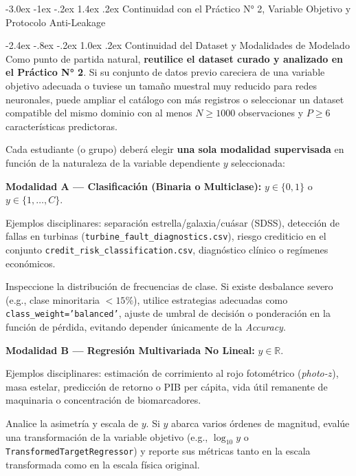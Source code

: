 \documentclass[11pt,a4paper]{article}
\makeatletter
\renewcommand\section{\@startsection{section}{1}{\z@}%
  {-3.0ex \@plus -1ex \@minus -.2ex}%
  {1.4ex \@plus .2ex}%
  {\color{NavyMain}\normalfont\Large\bfseries}}
\renewcommand\subsection{\@startsection{subsection}{2}{\z@}%
  {-2.4ex \@plus -.8ex \@minus -.2ex}%
  {1.0ex \@plus .2ex}%
  {\color{BlueAccent}\normalfont\large\bfseries}}
\newcommand{\secrule}{\vspace{-0.55em}\noindent{\color{NavyMain}\rule{\textwidth}{0.6pt}}\par\vspace{0.45em}}
\let\origitemize\itemize
\let\endorigitemize\enditemize
\renewenvironment{itemize}{\origitemize\setlength{\itemsep}{2pt}\setlength{\parskip}{0pt}\setlength{\parsep}{0pt}}{\endorigitemize}
\makeatother
\begin{document}
\section{Continuidad con el Práctico N° 2, Variable Objetivo y Protocolo Anti-Leakage}
\label{sec:target_leakage}
\secrule

\subsection{Continuidad del Dataset y Modalidades de Modelado}
Como punto de partida natural, \textbf{reutilice el dataset curado y analizado en el Práctico N° 2}. Si su conjunto de datos previo careciera de una variable objetivo adecuada o tuviese un tamaño muestral muy reducido para redes neuronales, puede ampliar el catálogo con más registros o seleccionar un dataset compatible del mismo dominio con al menos $N \ge 1000$ observaciones y $P \ge 6$ características predictoras.

Cada estudiante (o grupo) deberá elegir \textbf{una sola modalidad supervisada} en función de la naturaleza de la variable dependiente $y$ seleccionada:

\begin{itemize}
    \item \textbf{Modalidad A — Clasificación (Binaria o Multiclase):} $y \in \{0, 1\}$ o $y \in \{1, \dots, C\}$.
    \begin{itemize}
        \item Ejemplos disciplinares: separación estrella/galaxia/cuásar (SDSS), detección de fallas en turbinas (\texttt{turbine\_\allowbreak fault\_\allowbreak diagnostics.csv}), riesgo crediticio en el conjunto \texttt{credit\_\allowbreak risk\_\allowbreak classification.csv}, diagnóstico clínico o regímenes económicos.
        \item Inspeccione la distribución de frecuencias de clase. Si existe desbalance severo (e.g., clase minoritaria $< 15\%$), utilice estrategias adecuadas como \texttt{class\_weight='balanced'}, ajuste de umbral de decisión o ponderación en la función de pérdida, evitando depender únicamente de la \textit{Accuracy}.
    \end{itemize}
    \item \textbf{Modalidad B — Regresión Multivariada No Lineal:} $y \in \mathbb{R}$.
    \begin{itemize}
        \item Ejemplos disciplinares: estimación de corrimiento al rojo fotométrico (\textit{photo-$z$}), masa estelar, predicción de retorno o PIB per cápita, vida útil remanente de maquinaria o concentración de biomarcadores.
        \item Analice la asimetría y escala de $y$. Si $y$ abarca varios órdenes de magnitud, evalúe una transformación de la variable objetivo (e.g., $\log_{10} y$ o \texttt{TransformedTargetRegressor}) y reporte sus métricas tanto en la escala transformada como en la escala física original.
    \end{itemize}
\end{itemize}
\end{document}
